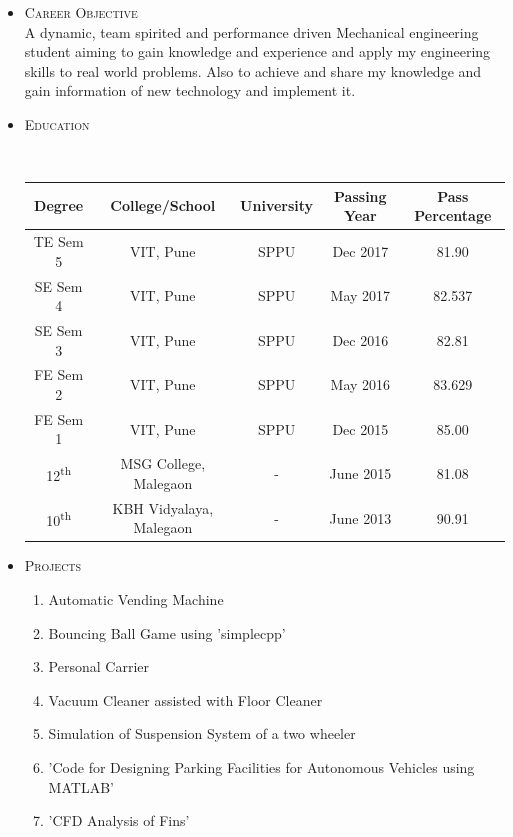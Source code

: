 \documentclass[10pt]{article}
\begin{document}
\begin{itemize}
	\bigskip
	\item  \LARGE{\textsc{Career Objective}} \\
	\small{A dynamic, team spirited and performance driven Mechanical engineering student aiming to gain knowledge and experience and apply my engineering skills to real world problems. Also to achieve and share my knowledge and gain information of new technology and implement it.} \\


\bigskip
\item \begin{LARGE}
	\textsc{Education}
\end{LARGE} \\

\begin{tabular}{||c|c|c|c|c||}
	\hline
	
	Degree & College/School & University & Passing Year & Pass Percentage \\ 
	\hline
	TE Sem 5 & VIT, Pune & SPPU & Dec 2017 & 81.90\\\hline
	SE Sem 4 & VIT, Pune & SPPU & May 2017 & 82.537\\\hline
	SE Sem 3 & VIT, Pune & SPPU & Dec 2016 & 82.81\\\hline
	FE Sem 2 & VIT, Pune & SPPU & May 2016 & 83.629\\\hline
	FE Sem 1 & VIT, Pune & SPPU & Dec 2015 & 85.00\\\hline
	12\textsuperscript{th} & MSG College, Malegaon & - & June 2015 & 81.08 \\
	\hline10\textsuperscript{th} & KBH Vidyalaya, Malegaon & - & June 2013 & 90.91 \\\hline
\end{tabular}



\bigskip
\item \LARGE{\textsc{Projects}}
\begin{small}
	\begin{enumerate}
		\itemsep0em
		\item Automatic Vending Machine
		\item Bouncing Ball Game using 'simplecpp'
		\item Personal Carrier
		\item Vacuum Cleaner assisted with Floor Cleaner
		\item Simulation of Suspension System of a two wheeler 	
		\item 'Code for Designing Parking Facilities for Autonomous Vehicles using MATLAB'
		\item 'CFD Analysis of Fins' 
	\end{enumerate}



\end{small}
\end{itemize}
\end{document}
